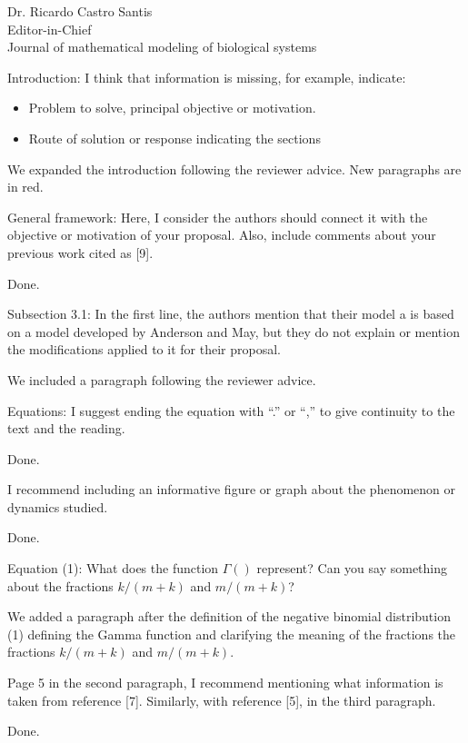 \documentclass [12pt]{letter}
\begin{document}
\begin{letter}{Dr. Ricardo Castro Santis\\ Editor-in-Chief \\ Journal of mathematical modeling of biological systems}
\begin{enumerate}
	\item Introduction: I think that information is missing, for example, indicate:
	\begin{itemize}
	\item Problem to solve, principal objective or motivation.	
	\item Route of solution or response indicating the sections
	\end{itemize}
	
	We expanded the introduction following the reviewer advice. New paragraphs are in red. 
	
	{\color{black}
	\item General framework: Here, I consider the authors should connect it with the
	objective or motivation of your proposal. Also, include comments about your
	previous work cited as [9].
	}	
	
	Done.
	
	{\color{black}
	\item Subsection 3.1: In the first line, the authors mention that their model a is based on
	a model developed by Anderson and May, but they do not explain or mention the
	modifications applied to it for their proposal.
	}

	We included a paragraph following the reviewer advice.

	\item Equations: I suggest ending the equation with “.” or “,” to give continuity to the text
	and the reading.
	
	Done.
	
	\item I recommend including an informative figure or graph about the phenomenon or
	dynamics studied.
	
	Done.
	
	\item Equation (1): What does the function $\Gamma()$ represent? Can you say something about
	the fractions $k/(m+k)$ and $m/(m+k)$?
	
We added a paragraph after the definition of the negative binomial distribution (1) defining the Gamma function and clarifying the meaning of the fractions the fractions $k/(m+k)$ and $m/(m+k)$. 
	
	\item Page 5 in the second paragraph, I recommend mentioning what information is
	taken from reference [7]. Similarly, with reference [5], in the third paragraph.
	
	Done.
	

\end{enumerate}
\end{letter}
\end{document}
